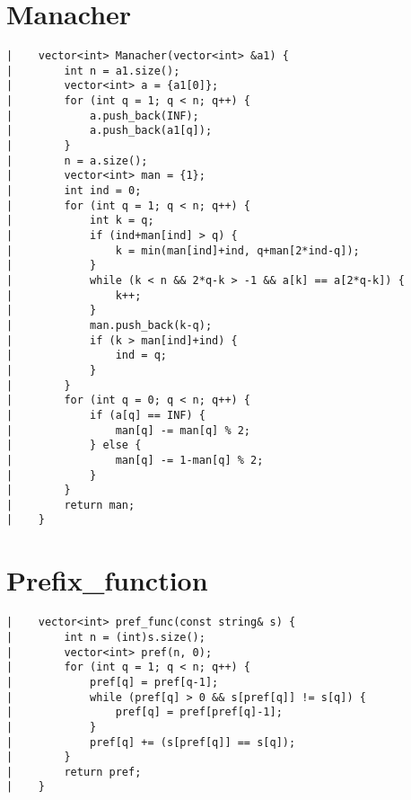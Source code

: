 \documentclass[a4paper, 10pt]{article}
\begin{document}
\begin{center}
\section*{Manacher}
\begin{verbatim}
|    vector<int> Manacher(vector<int> &a1) {
|        int n = a1.size();
|        vector<int> a = {a1[0]};
|        for (int q = 1; q < n; q++) {
|            a.push_back(INF);
|            a.push_back(a1[q]);
|        }
|        n = a.size();
|        vector<int> man = {1};
|        int ind = 0;
|        for (int q = 1; q < n; q++) {
|            int k = q;
|            if (ind+man[ind] > q) {
|                k = min(man[ind]+ind, q+man[2*ind-q]);
|            }
|            while (k < n && 2*q-k > -1 && a[k] == a[2*q-k]) {
|                k++;
|            }
|            man.push_back(k-q);
|            if (k > man[ind]+ind) {
|                ind = q;
|            }
|        }
|        for (int q = 0; q < n; q++) {
|            if (a[q] == INF) {
|                man[q] -= man[q] % 2;
|            } else {
|                man[q] -= 1-man[q] % 2;
|            }
|        }
|        return man;
|    }
\end{verbatim}

\section*{Prefix\_function}
\begin{verbatim}
|    vector<int> pref_func(const string& s) {
|        int n = (int)s.size();
|        vector<int> pref(n, 0);
|        for (int q = 1; q < n; q++) {
|            pref[q] = pref[q-1];
|            while (pref[q] > 0 && s[pref[q]] != s[q]) {
|                pref[q] = pref[pref[q]-1];
|            }
|            pref[q] += (s[pref[q]] == s[q]);
|        }
|        return pref;
|    }
\end{verbatim}


\end{center}
\end{document}
